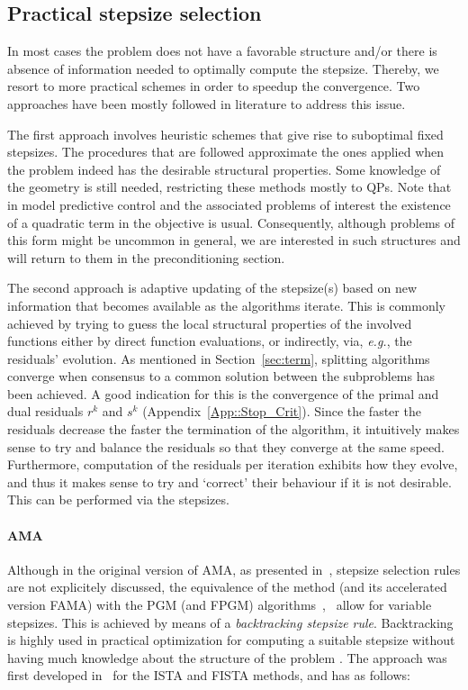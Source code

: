 \documentclass[openany]{now}
\newcommand{\eg}{{\it e.g.}}
\begin{document}
\subsection{Practical stepsize selection}
In most cases the problem does not have a favorable structure and/or there is absence of information needed to optimally compute the stepsize. Thereby, we resort to more practical schemes in order to speedup the convergence. Two approaches have been mostly followed in literature to address this issue.

The first approach involves heuristic schemes that give rise to suboptimal fixed stepsizes. The procedures that are followed approximate the ones applied when the problem indeed has the desirable structural properties. Some knowledge of the geometry is still needed, restricting these methods mostly to QPs. Note that in model predictive control and the associated problems of interest the existence of a quadratic term in the objective is usual. Consequently, although problems of this form might be uncommon in general, we are interested in such structures and will return to them in the preconditioning section.

The second approach is adaptive updating of the stepsize(s) based on new information that becomes available as the algorithms iterate. This is commonly achieved by trying to guess the local structural properties of the involved functions either by direct function evaluations, or indirectly, via, \eg, the residuals' evolution. As mentioned in Section~\ref{sec:term},  splitting algorithms converge when consensus to a common solution between the subproblems has been achieved. A good indication for this is the convergence of the primal and dual residuals $r^k$ and $s^k$ (Appendix~\ref{App::Stop_Crit}). Since the faster the residuals decrease the faster the termination of the algorithm, it intuitively makes sense to try and balance the residuals so that they converge at the same speed. Furthermore, computation of the residuals per iteration exhibits how they evolve, and thus it makes sense to try and `correct' their behaviour if it is not desirable. This can be performed via the stepsizes.

\paragraph*{AMA} Although in the original version of AMA, as presented in~\cite{ama}, stepsize selection rules are not explicitely discussed, the equivalence of the method (and its accelerated version FAMA) with the PGM (and FPGM) algorithms~\cite{fista},~\cite{beck2014fast} allow for variable stepsizes. This is achieved by means of a \emph{backtracking stepsize rule}. Backtracking is highly used in practical optimization for computing a suitable stepsize without having much knowledge about the structure of the problem \cite[Chapter~3]{nocedal2006numerical}. The approach was first developed in~\cite{fista} for the ISTA and FISTA methods, and has as follows:
\end{document}
